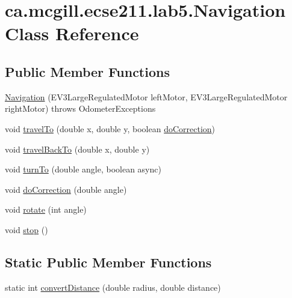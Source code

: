 \hypertarget{classca_1_1mcgill_1_1ecse211_1_1lab5_1_1_navigation}{}\section{ca.\+mcgill.\+ecse211.\+lab5.\+Navigation Class Reference}
\label{classca_1_1mcgill_1_1ecse211_1_1lab5_1_1_navigation}
\subsection*{Public Member Functions}
\begin{DoxyCompactItemize}
\item 
\hyperlink{classca_1_1mcgill_1_1ecse211_1_1lab5_1_1_navigation_a93b746f61226c3b14532c43d0c2f61dd}{Navigation} (E\+V3\+Large\+Regulated\+Motor left\+Motor, E\+V3\+Large\+Regulated\+Motor right\+Motor)  throws Odometer\+Exceptions 
\item 
void \hyperlink{classca_1_1mcgill_1_1ecse211_1_1lab5_1_1_navigation_a318969f4776d0bf4a8721be3d2444a5c}{travel\+To} (double x, double y, boolean \hyperlink{classca_1_1mcgill_1_1ecse211_1_1lab5_1_1_navigation_a73a89ddd822e0ba1cfd7a29c18aa7aea}{do\+Correction})
\item 
void \hyperlink{classca_1_1mcgill_1_1ecse211_1_1lab5_1_1_navigation_aacb83ee18419dcd6095e331975cf2167}{travel\+Back\+To} (double x, double y)
\item 
void \hyperlink{classca_1_1mcgill_1_1ecse211_1_1lab5_1_1_navigation_a2b39928c8062fe6863de8e818d009e91}{turn\+To} (double angle, boolean async)
\item 
void \hyperlink{classca_1_1mcgill_1_1ecse211_1_1lab5_1_1_navigation_a73a89ddd822e0ba1cfd7a29c18aa7aea}{do\+Correction} (double angle)
\item 
void \hyperlink{classca_1_1mcgill_1_1ecse211_1_1lab5_1_1_navigation_a5fcce0063a6b557d349a6fb5bf144c64}{rotate} (int angle)
\item 
void \hyperlink{classca_1_1mcgill_1_1ecse211_1_1lab5_1_1_navigation_afe038af6692e7ad28c3587cd979d7223}{stop} ()
\end{DoxyCompactItemize}
\subsection*{Static Public Member Functions}
\begin{DoxyCompactItemize}
\item 
static int \hyperlink{classca_1_1mcgill_1_1ecse211_1_1lab5_1_1_navigation_a85122ad723d0988c118866f367073be6}{convert\+Distance} (double radius, double distance)
\end{DoxyCompactItemize}


